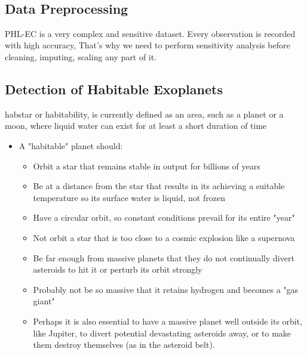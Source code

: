 \documentclass[11pt]{article}
\providecommand{\tightlist}{%
      \setlength{\itemsep}{0pt}\setlength{\parskip}{0pt}}
\begin{document}
    \begin{center}
    \end{center}
    { \hspace*{\fill} \\}
    
    \subsection{Data Preprocessing}\label{data-preprocessing}

PHL-EC is a very complex and sensitive dataset. Every observation is
recorded with high accuracy, That's why we need to perform sensitivity
analysis before cleaning, imputing, scaling any part of it.

    \subsection{Detection of Habitable
Exoplanets}\label{detection-of-habitable-exoplanets}

habstar or habitability, is currently defined as an area, such as a
planet or a moon, where liquid water can exist for at least a short
duration of time

\begin{itemize}
\tightlist
\item
  A "habitable" planet should:

  \begin{itemize}
  \tightlist
  \item
    Orbit a star that remains stable in output for billions of years
  \item
    Be at a distance from the star that results in its achieving a
    suitable temperature so its surface water is liquid, not frozen
  \item
    Have a circular orbit, so constant conditions prevail for its entire
    "year"
  \item
    Not orbit a star that is too close to a cosmic explosion like a
    supernova
  \item
    Be far enough from massive planets that they do not continually
    divert asteroids to hit it or perturb its orbit strongly
  \item
    Probably not be so massive that it retains hydrogen and becomes a
    "gas giant"
  \item
    Perhaps it is also essential to have a massive planet well outside
    its orbit, like Jupiter, to divert potential devastating asteroids
    away, or to make them destroy themselves (as in the asteroid belt).
  \end{itemize}
\end{itemize}
\end{document}
